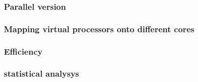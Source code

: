 \subsubsection*{Parallel version}
\subsubsection*{Mapping virtual processors onto different cores} 
\subsubsection*{Efficiency} 
\subsubsection*{statistical analysys}

